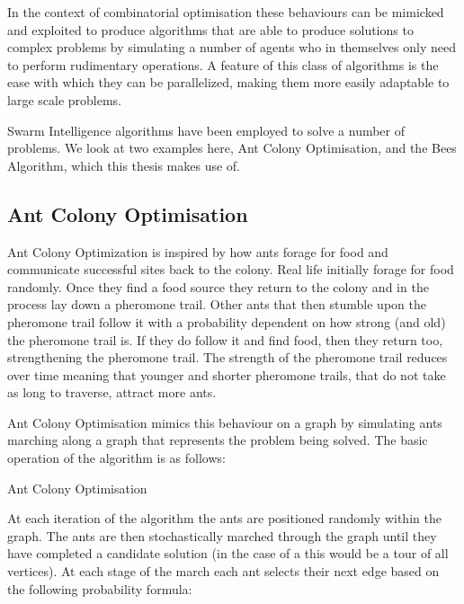 In the context of combinatorial optimisation these behaviours can be mimicked and exploited to produce algorithms that are able to produce solutions to complex problems by simulating a number of agents who in themselves only need to perform rudimentary operations. A feature of this class of algorithms is the ease with which they can be parallelized, making them more easily adaptable to large scale problems.

Swarm Intelligence algorithms have been employed to solve a number of problems. We look at two examples here, Ant Colony Optimisation, and the Bees Algorithm, which this thesis makes use of.

\subsection{Ant Colony Optimisation}

Ant Colony Optimization is inspired by how ants forage for food and communicate successful sites back to the colony. Real life initially forage for food randomly. Once they find a food source they return to the colony and in the process lay down a pheromone trail. Other ants that then stumble upon the pheromone trail follow it with a probability dependent on how strong (and old) the pheromone trail is. If they do follow it and find food, then they return too, strengthening the pheromone trail. The strength of the pheromone trail reduces over time meaning that younger and shorter pheromone trails, that do not take as long to traverse, attract more ants.  


Ant Colony Optimisation mimics this behaviour on a graph by simulating ants marching along a graph that represents the problem being solved. The basic operation of the algorithm is as follows: 

\begin{algorithm}[H]
   \caption{Ant Colony Optimisation}
\end{algorithm}
 
At each iteration of the algorithm the ants are positioned randomly within the graph. The ants are then stochastically marched through the graph until they have completed a candidate solution (in the case of a \TSP this would be a tour of all vertices). At each stage of the march each ant selects their next edge based on the following probability formula:

